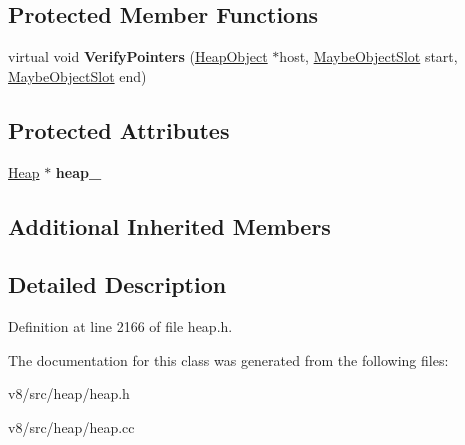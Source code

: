 \subsection*{Protected Member Functions}
\begin{DoxyCompactItemize}
\item 
\mbox{\label{classv8_1_1internal_1_1VerifyPointersVisitor_a9216a972a4dc944e4c9cf403ca4d2b1b}} 
virtual void {\bfseries Verify\+Pointers} (\mbox{\hyperlink{classv8_1_1internal_1_1HeapObject}{Heap\+Object}} $\ast$host, \mbox{\hyperlink{classv8_1_1internal_1_1MaybeObjectSlot}{Maybe\+Object\+Slot}} start, \mbox{\hyperlink{classv8_1_1internal_1_1MaybeObjectSlot}{Maybe\+Object\+Slot}} end)
\end{DoxyCompactItemize}
\subsection*{Protected Attributes}
\begin{DoxyCompactItemize}
\item 
\mbox{\label{classv8_1_1internal_1_1VerifyPointersVisitor_a602c5bc5ac7c99b38879f29952b038b5}} 
\mbox{\hyperlink{classv8_1_1internal_1_1Heap}{Heap}} $\ast$ {\bfseries heap\+\_\+}
\end{DoxyCompactItemize}
\subsection*{Additional Inherited Members}


\subsection{Detailed Description}


Definition at line 2166 of file heap.\+h.



The documentation for this class was generated from the following files\+:\begin{DoxyCompactItemize}
\item 
v8/src/heap/heap.\+h\item 
v8/src/heap/heap.\+cc\end{DoxyCompactItemize}
